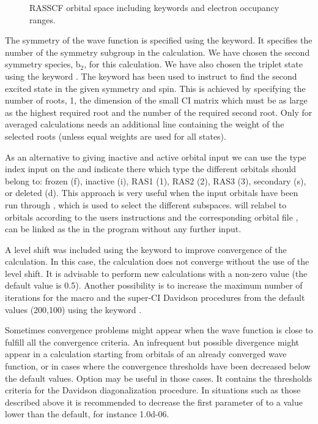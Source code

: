 \begin{figure}
\caption{RASSCF orbital space including keywords and electron occupancy ranges.}
\label{fig:rasscf_space}
\end{figure}
The symmetry of the wave function is specified using the
 keyword.  It specifies the number of the symmetry 
subgroup in the calculation.  We have chosen the second symmetry
species, b$_2$, for this calculation.  We have also chosen the triplet
state using the keyword . The keyword  has been 
used to instruct  to find the second excited state in the 
given symmetry and spin. This is achieved by specifying the number of roots,
1, the dimension of the small CI matrix which must be as large as the
highest required root and the number of the required second root.  
Only for averaged calculations  needs an additional line
containing the weight of the selected roots (unless equal weights are used for
all states).

As an alternative to giving inactive and active orbital input we can use the
type index input on the  and indicate there which type the
different orbitals should belong to: frozen (f), inactive (i), RAS1 (1), RAS2
(2), RAS3 (3), secondary (s), or deleted (d). This approach is very useful when the input
orbitals have been run through , which is used to select the
different subspaces.  will relabel to orbitals according to the
users instructions and the corresponding orbital file , can be
linked as the  in the  program without any 
further input.

A level shift was included using the  keyword 
to improve convergence of the calculation. In this case, the calculation
does not converge without the use of the level shift.  It is advisable to
perform new calculations with a non-zero  value (the default
value is 0.5). Another possibility is to increase the maximum number of 
iterations for the macro and the super-CI Davidson procedures
from the default values (200,100) using the keyword . 

Sometimes convergence problems might appear when the wave function is
close to fulfill all the convergence criteria. An infrequent but possible 
divergence might appear in a calculation starting from orbitals of an already 
converged wave function, or in cases where the convergence thresholds
have been decreased below the default values.
Option  may be useful in those cases. It contains the 
thresholds criteria for the Davidson diagonalization procedure. In situations
such as those described above it is recommended to decrease the first
parameter of  to a value lower than the default, for instance
1.0d-06.

